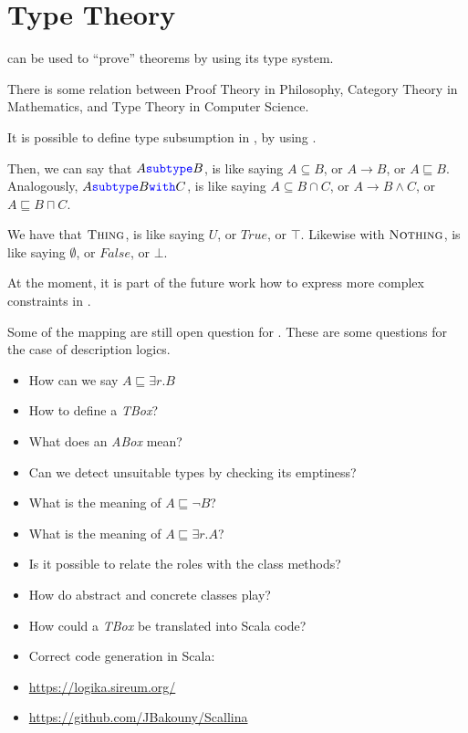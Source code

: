 \section{Type Theory}

\Soda can be used to ``prove'' theorems by using its type system.

There is some relation between Proof Theory in Philosophy, Category Theory in Mathematics, and Type Theory in Computer Science.

It is possible to define type subsumption in \Soda, by using \ssubtype.

Then, we can say that $A {\color{blue}\texttt{{subtype}}} B$, is like saying $A \subseteq B$, or $A \to B$, or $A \sqsubseteq B$.
Analogously, $A {\color{blue}\texttt{{subtype}}} B {\color{blue}\texttt{{with}}} C$, is like saying $A \subseteq B \cap C $, or $A \to B \land C$, or $A \sqsubseteq B \sqcap C$.

We have that $\textsc{Thing}$, is like saying $U$, or $True$, or $\top$.
Likewise with $\textsc{Nothing}$, is like saying $\emptyset$, or $False$, or $\bot$.

At the moment, it is part of the future work how to express more complex constraints in \Soda.

Some of the mapping are still open question for \Soda.
These are some questions for the case of description logics.

\begin{itemize}
    \item How can we say $A \sqsubseteq \exists r. B $
    \item How to define a \textit{TBox}?
    \item What does an \textit{ABox} mean?
    \item Can we detect unsuitable types by checking its emptiness?
    \item What is the meaning of $A \sqsubseteq \lnot B$?
    \item What is the meaning of $A \sqsubseteq \exists r. A$?
    \item Is it possible to relate the roles with the class methods?
    \item How do abstract and concrete classes play?
    \item How could a \textit{TBox} be translated into Scala code?
\end{itemize}

\begin{itemize}
    \item Correct code generation in Scala:
    \item \url{https://logika.sireum.org/}
    \item \url{https://github.com/JBakouny/Scallina}
\end{itemize}

